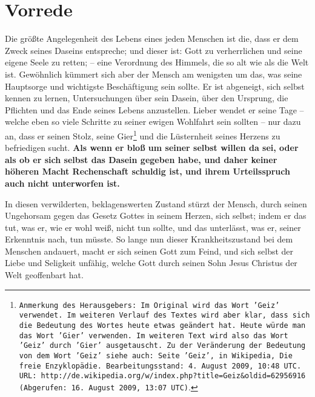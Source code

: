 \chapter{Vorrede}

Die größte Angelegenheit des Lebens eines jeden Menschen ist die, dass er dem
Zweck seines Daseins entspreche; und dieser ist: Gott zu verherrlichen und seine
eigene Seele zu retten; -- eine Verordnung des Himmels, die so alt wie als die
Welt ist. Gewöhnlich kümmert sich aber der Mensch am wenigsten um das, was seine
Hauptsorge und wichtigste Beschäftigung sein sollte. Er ist abgeneigt, sich
selbst kennen zu lernen, Untersuchungen über sein Dasein, über den Ursprung, die
Pflichten und das Ende seines Lebens anzustellen. Lieber wendet er seine Tage
-- welche eben so viele Schritte zu seiner ewigen Wohlfahrt sein sollten -- nur
dazu an, dass er seinen Stolz, seine Gier\footnote{\texttt{Anmerkung des
Herausgebers:
Im Original wird das Wort 'Geiz' verwendet. Im weiteren Verlauf des
Textes wird aber klar, dass sich die Bedeutung des Wortes heute etwas geändert
hat. Heute würde man das Wort 'Gier' verwenden. Im weiteren Text wird also das
Wort 'Geiz' durch 'Gier' ausgetauscht. Zu der Veränderung der Bedeutung von
dem Wort 'Geiz' siehe auch: Seite 'Geiz', in Wikipedia, Die freie
Enzyklopädie. Bearbeitungsstand: 4. August 2009, 10:48 UTC. URL:
http://de.wikipedia.org/w/index.php?title=Geiz\&oldid=62956916 (Abgerufen: 16.
August 2009, 13:07 UTC)}.} und die Lüsternheit seines Herzens zu befriedigen
sucht.
\label{ref:vorw_sinndes_lebens}
\textbf{Als wenn er bloß um seiner selbst willen da sei, oder als ob er
sich selbst das Dasein gegeben habe, und daher keiner höheren Macht Rechenschaft
schuldig ist, und ihrem Urteilsspruch auch nicht unterworfen ist.}

\medskip

In diesen verwilderten, beklagenswerten Zustand stürzt der Mensch, durch seinen
Ungehorsam gegen das Gesetz Gottes in seinem Herzen, sich selbst; indem er das
tut, was er, wie er wohl weiß, nicht tun sollte, und das unterlässt, was er,
seiner Erkenntnis nach, tun müsste. So lange nun dieser Krankheitszustand bei
dem Menschen andauert, macht er sich seinen Gott zum Feind, und sich selbst der
Liebe und Seligkeit unfähig, welche Gott durch seinen Sohn Jesus Christus der
Welt geoffenbart hat.

\medskip


